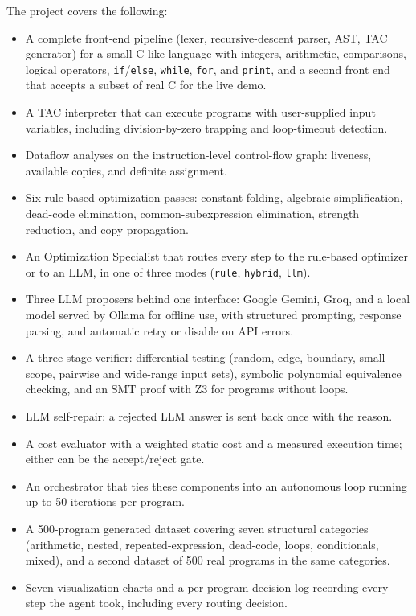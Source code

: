 \documentclass[12pt,a4paper]{report}
\begin{document}
The project covers the following:
\begin{itemize}[leftmargin=2cm]
  \item A complete front-end pipeline (lexer, recursive-descent parser, AST, TAC generator) for a small C-like language with integers, arithmetic, comparisons, logical operators, \texttt{if}/\texttt{else}, \texttt{while}, \texttt{for}, and \texttt{print}, and a second front end that accepts a subset of real C for the live demo.
  \item A TAC interpreter that can execute programs with user-supplied input variables, including division-by-zero trapping and loop-timeout detection.
  \item Dataflow analyses on the instruction-level control-flow graph: liveness, available copies, and definite assignment.
  \item Six rule-based optimization passes: constant folding, algebraic simplification, dead-code elimination, common-subexpression elimination, strength reduction, and copy propagation.
  \item An Optimization Specialist that routes every step to the rule-based optimizer or to an LLM, in one of three modes (\texttt{rule}, \texttt{hybrid}, \texttt{llm}).
  \item Three LLM proposers behind one interface: Google Gemini, Groq, and a local model served by Ollama for offline use, with structured prompting, response parsing, and automatic retry or disable on API errors.
  \item A three-stage verifier: differential testing (random, edge, boundary, small-scope, pairwise and wide-range input sets), symbolic polynomial equivalence checking, and an SMT proof with Z3 for programs without loops.
  \item LLM self-repair: a rejected LLM answer is sent back once with the reason.
  \item A cost evaluator with a weighted static cost and a measured execution time; either can be the accept/reject gate.
  \item An orchestrator that ties these components into an autonomous loop running up to 50 iterations per program.
  \item A 500-program generated dataset covering seven structural categories (arithmetic, nested, repeated-expression, dead-code, loops, conditionals, mixed), and a second dataset of 500 real programs in the same categories.
  \item Seven visualization charts and a per-program decision log recording every step the agent took, including every routing decision.
\end{itemize}
\end{document}

